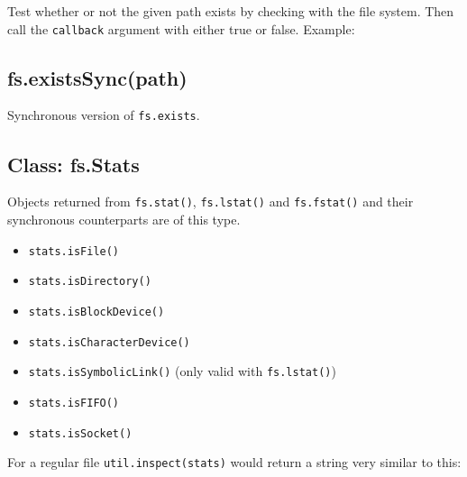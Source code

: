 Test whether or not the given path exists by checking with the file
system. Then call the \texttt{callback} argument with either true or
false. Example:

\begin{Shaded}
\begin{Highlighting}[]
\NormalTok{(}\NormalTok{, } 
   \NormalTok{: }\NormalTok{);}
\NormalTok{\});}
\end{Highlighting}
\end{Shaded}

\subsection{fs.existsSync(path)}

Synchronous version of \texttt{fs.exists}.

\subsection{Class: fs.Stats}

Objects returned from \texttt{fs.stat()}, \texttt{fs.lstat()} and
\texttt{fs.fstat()} and their synchronous counterparts are of this type.

\begin{itemize}
\item
  \texttt{stats.isFile()}
\item
  \texttt{stats.isDirectory()}
\item
  \texttt{stats.isBlockDevice()}
\item
  \texttt{stats.isCharacterDevice()}
\item
  \texttt{stats.isSymbolicLink()} (only valid with \texttt{fs.lstat()})
\item
  \texttt{stats.isFIFO()}
\item
  \texttt{stats.isSocket()}
\end{itemize}

For a regular file \texttt{util.inspect(stats)} would return a string
very similar to this:

